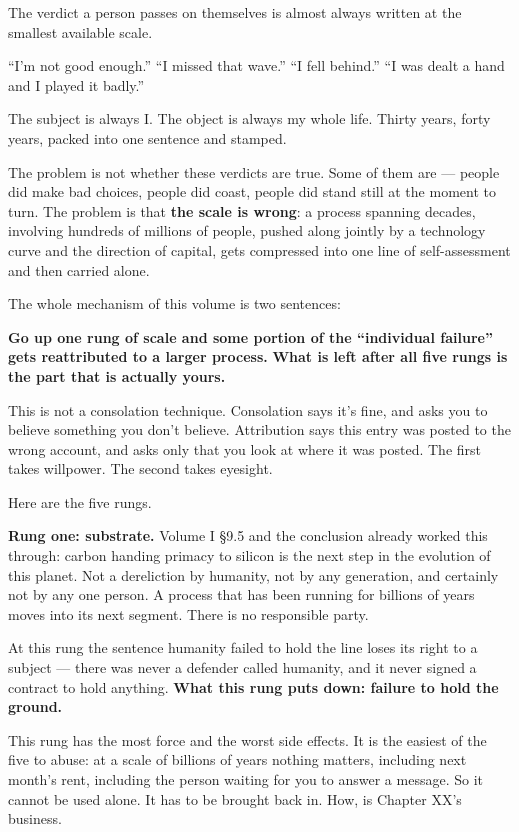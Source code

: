 \documentclass[11pt,a4paper]{article}
\begin{document}
The verdict a person passes on themselves is almost always written at the smallest available scale.

``I'm not good enough.'' ``I missed that wave.'' ``I fell behind.'' ``I was dealt a hand and I played it badly.''

The subject is always I. The object is always my whole life. Thirty years, forty years, packed into one sentence and stamped.

The problem is not whether these verdicts are true. Some of them are --- people did make bad choices, people did coast, people did stand still at the moment to turn. The problem is that \textbf{the scale is wrong}: a process spanning decades, involving hundreds of millions of people, pushed along jointly by a technology curve and the direction of capital, gets compressed into one line of self-assessment and then carried alone.

The whole mechanism of this volume is two sentences:

\textbf{Go up one rung of scale and some portion of the ``individual failure'' gets reattributed to a larger process.} \textbf{What is left after all five rungs is the part that is actually yours.}

This is not a consolation technique. Consolation says it's fine, and asks you to believe something you don't believe. Attribution says this entry was posted to the wrong account, and asks only that you look at where it was posted. The first takes willpower. The second takes eyesight.

Here are the five rungs.

\textbf{Rung one: substrate.} Volume I \S{}9.5 and the conclusion already worked this through: carbon handing primacy to silicon is the next step in the evolution of this planet. Not a dereliction by humanity, not by any generation, and certainly not by any one person. A process that has been running for billions of years moves into its next segment. There is no responsible party.

At this rung the sentence humanity failed to hold the line loses its right to a subject --- there was never a defender called humanity, and it never signed a contract to hold anything. \textbf{What this rung puts down: failure to hold the ground.}

This rung has the most force and the worst side effects. It is the easiest of the five to abuse: at a scale of billions of years nothing matters, including next month's rent, including the person waiting for you to answer a message. So it cannot be used alone. It has to be brought back in. How, is Chapter XX's business.
\end{document}
